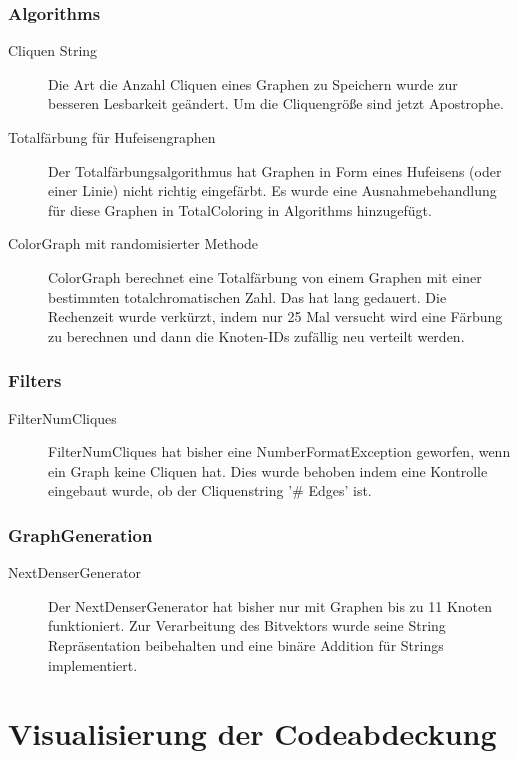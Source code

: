 \documentclass[13pt]{scrreprt}
\begin{document}
\subsection{Algorithms}
\begin{description}
\item [Cliquen String] Die Art die Anzahl Cliquen eines Graphen zu Speichern wurde zur besseren Lesbarkeit geändert. Um die Cliquengröße sind jetzt Apostrophe.
\item[Totalfärbung für Hufeisengraphen] Der Totalfärbungsalgorithmus hat Graphen in Form eines Hufeisens (oder einer Linie) nicht richtig eingefärbt. Es wurde eine Ausnahmebehandlung für diese Graphen in TotalColoring in Algorithms hinzugefügt.
\item[ColorGraph mit randomisierter Methode] ColorGraph berechnet eine Totalfärbung von einem Graphen mit einer bestimmten totalchromatischen Zahl. Das hat lang gedauert. Die Rechenzeit wurde verkürzt, indem nur 25 Mal versucht wird eine Färbung zu berechnen und dann die Knoten-IDs zufällig neu verteilt werden.
\end{description}

\subsection{Filters}
\begin{description}
\item[FilterNumCliques] FilterNumCliques hat bisher eine NumberFormatException geworfen, wenn ein Graph keine Cliquen hat. Dies wurde behoben indem eine Kontrolle eingebaut wurde, ob der Cliquenstring '\# Edges' ist.
\end{description}

\subsection{GraphGeneration}
\begin{description}
\item[NextDenserGenerator] Der NextDenserGenerator hat bisher nur mit Graphen bis zu 11 Knoten funktioniert. Zur Verarbeitung des Bitvektors wurde seine String Repräsentation beibehalten und eine binäre Addition für Strings implementiert.
\end{description}

\chapter{Visualisierung der Codeabdeckung}

\glsaddall
\printnoidxglossaries
\end{document}
